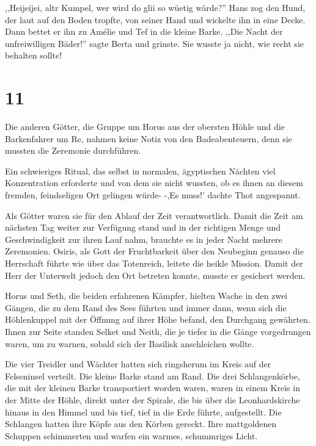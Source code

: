 \documentclass[11pt,titlepage,a5paper]{book}
\newcommand{\am}{Amélie }
\begin{document}
 ,,Heijeijei, altr Kumpel, wer wird do glii so wüetig wärde?'' Hans zog den Hund, der laut auf den Boden tropfte, von seiner Hand und wickelte ihn in eine Decke. Dann bettet er ihn zu \am und Tef in die kleine Barke. ,,Die Nacht der unfreiwilligen  Bäder!'' sagte Berta und grinste. Sie wusste ja nicht, wie recht sie behalten sollte!

\section*{11}

Die anderen Götter, die Gruppe um Horus aus der obersten Höhle und die Barkenfahrer um Re, nahmen keine Notiz von den Badeabenteuern, denn sie mussten die Zeremonie durchführen.

Ein schwieriges Ritual, das selbst in normalen, ägyptischen Nächten viel Konzentration erforderte und von dem sie nicht wussten, ob es ihnen an diesem fremden, feindseligen Ort gelingen würde- -,Es muss!' dachte Thot angespannt. 

Als Götter waren sie für den Ablauf der Zeit verantwortlich. Damit die Zeit am nächsten Tag weiter zur Verfügung stand und in der richtigen Menge und Geschwindigkeit zur ihren Lauf nahm, brauchte es in jeder Nacht mehrere Zeremonien. Osiris, als Gott der Fruchtbarkeit über den Neubeginn genauso die Herrschaft führte wie über das Totenreich, leitete die heikle Mission. Damit der Herr der Unterwelt jedoch den Ort betreten konnte, musste er gesichert werden.

Horus und Seth, die beiden erfahrenen Kämpfer, hielten Wache in den zwei Gängen, die zu dem Rand des Sees führten und immer dann, wenn sich die Höhlenkuppel mit der Öffnung auf ihrer Höhe befand, den Durchgang gewährten. Ihnen zur Seite standen Selket und Neith, die je tiefer in die Gänge vorgedrungen waren, um zu warnen, sobald sich der Basilisk anschleichen wollte.

Die vier Treidler und Wächter hatten sich ringsherum im Kreis auf der Felseninsel verteilt. Die kleine Barke stand am Rand. Die drei Schlangenkörbe, die mit der kleinen Barke transportiert worden waren, waren in einem Kreis in der Mitte der Höhle, direkt unter der Spirale, die bis über die Leonhardskirche hinaus in den Himmel und bis tief, tief in die Erde führte, aufgestellt. Die Schlangen hatten ihre Köpfe aus den Körben gereckt. Ihre mattgoldenen Schuppen schimmerten und warfen ein warmes, schummriges Licht. 
\end{document}
